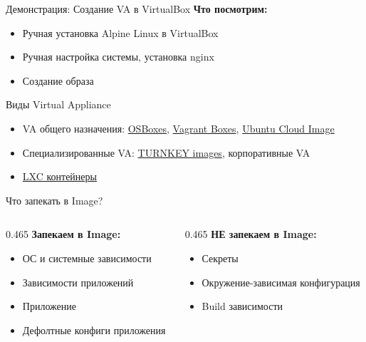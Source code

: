 \documentclass[aspectratio=169]{beamer}
\begin{document}
    \begin{frame}{Демонстрация: Создание VA в VirtualBox}
        \textbf{Что посмотрим:}
        \begin{itemize}
            \item Ручная установка Alpine Linux в VirtualBox
            \item Ручная настройка системы, установка nginx
            \item Создание образа
        \end{itemize}
    \end{frame}

    \begin{frame}{Виды Virtual Appliance}
        \begin{itemize}
            \item VA общего назначения: \href{https://www.osboxes.org}{OSBoxes}, \href{https://portal.cloud.hashicorp.com/vagrant/discover}{Vagrant Boxes}, \href{https://cloud-images.ubuntu.com/}{Ubuntu Cloud Image}
            \item Специализированные VA: \href{https://www.turnkeylinux.org/}{TURNKEY images}, корпоративные VA
            \item \href{https://images.linuxcontainers.org/images}{LXC контейнеры}
        \end{itemize}
    \end{frame}

    \begin{frame}{Что запекать в Image?}
        \begin{columns}[t]
            \begin{column}[t]{0.465\textwidth}
                \textbf{Запекаем в Image:}
                \begin{itemize}
                    \item ОС и системные зависимости
                    \item Зависимости приложений
                    \item Приложение
                    \item Дефолтные конфиги приложения
                \end{itemize}
            \end{column}

            \begin{column}[t]{0.465\textwidth}
                \textbf{НЕ запекаем в Image:}
                \begin{itemize}
                    \item Секреты
                    \item Окружение-зависимая конфигурация
                    \item Build зависимости
                \end{itemize}
            \end{column}
        \end{columns}
    \end{frame}
\end{document}
